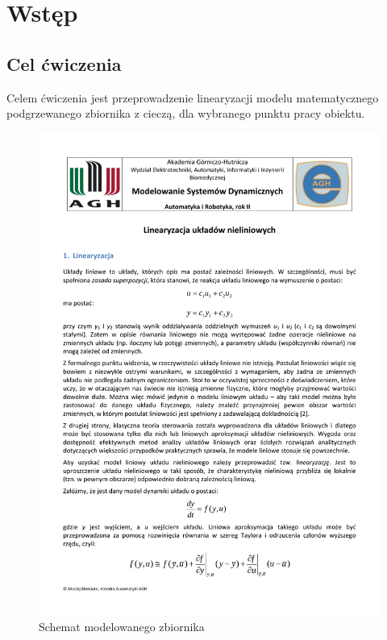\documentclass[12pt]{article}
\begin{document}


\section{Wstęp}

\subsection{Cel ćwiczenia}

Celem ćwiczenia jest przeprowadzenie linearyzacji modelu matematycznego
podgrzewanego zbiornika z cieczą, dla wybranego punktu pracy obiektu.


\begin{figure}[!htb]
	\begin{center}
		\includegraphics[page=2,width=14cm,trim=3cm 3cm 3cm 17.5cm,clip]
		{../res/img/schemat.pdf}
	\end{center}
	\caption{Schemat modelowanego zbiornika}
\end{figure}
\end{document}
